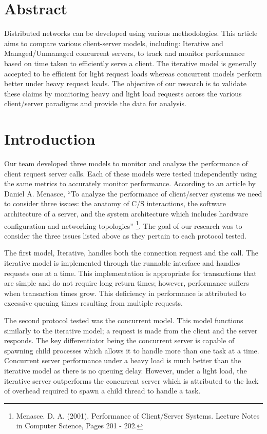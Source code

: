 \section*{Abstract}

Distributed networks can be developed using various methodologies. 
This article aims to compare various client-server models, including: 
Iterative and Managed/Unmanaged concurrent servers, to track and monitor performance based on time taken to efficiently serve a client. 
The iterative model is generally accepted to be efficient for light request loads whereas concurrent models perform better under heavy request loads. 
The objective of our research is to validate these claims by monitoring heavy and light load requests across the various client/server paradigms and provide the data for analysis.

\section{Introduction}

Our team developed three models to monitor and analyze the performance of client request server calls. 
Each of these models were tested independently using the same metrics to accurately monitor performance. 
According to an article by Daniel A. Menasce, 
``To analyze the performance of client/server systems we need to consider three issues: the anatomy of C/S interactions, the software architecture of a server, and the system architecture which includes hardware configuration and networking topologies''
\footnote{
	Menasce. D. A. (2001). Performance of Client/Server Systems. Lecture Notes in Computer Science, Pages 201 - 202.
}.
The goal of our research was to consider the three issues listed above as they pertain to each protocol tested. 

The first model, Iterative, handles both the connection request and the call. 
The iterative model is implemented through the runnable interface and handles requests one at a time. 
This implementation is appropriate for transactions that are simple and do not require long return times; however, performance suffers when transaction times grow. 
This deficiency in performance is attributed to excessive queuing times resulting from multiple requests. 

The second protocol tested was the concurrent model. 
This model functions similarly to the iterative model; a request is made from the client and the server responds. 
The key differentiator being the concurrent server is capable of spawning child processes which allows it to handle more than one task at a time. 
Concurrent server performance under a heavy load is much better than the iterative model as there is no queuing delay. 
However, under a light load, the iterative server outperforms the concurrent server which is attributed to the lack of overhead required to spawn a child thread to handle a task. 

